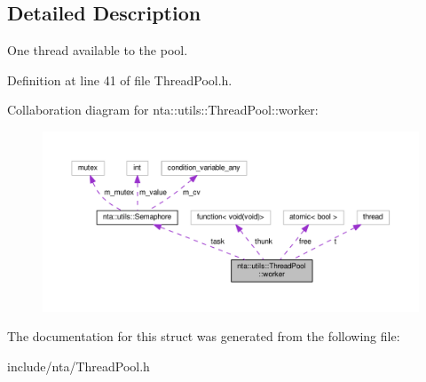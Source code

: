 \subsection{Detailed Description}
One thread available to the pool. 

Definition at line 41 of file Thread\+Pool.\+h.



Collaboration diagram for nta\+:\+:utils\+:\+:Thread\+Pool\+:\+:worker\+:
\nopagebreak
\begin{figure}[H]
\begin{center}
\leavevmode
\includegraphics[width=350pt]{da/d21/structnta_1_1utils_1_1ThreadPool_1_1worker__coll__graph}
\end{center}
\end{figure}


The documentation for this struct was generated from the following file\+:\begin{DoxyCompactItemize}
\item 
include/nta/Thread\+Pool.\+h\end{DoxyCompactItemize}
